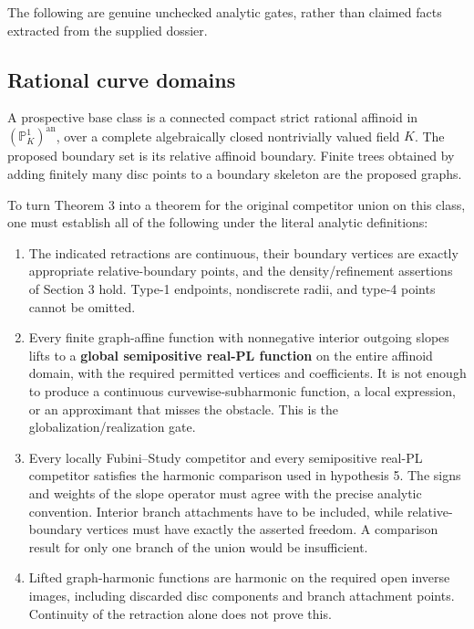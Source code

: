 \documentclass[
  11pt,
]{article}
\begin{document}
The following are genuine unchecked analytic gates, rather than claimed
facts extracted from the supplied dossier.

\subsection{Rational curve domains}\label{rational-curve-domains}

A prospective base class is a connected compact strict rational affinoid
in \((\mathbb P^1_K)^{\mathrm{an}}\), over a complete algebraically
closed nontrivially valued field \(K\). The proposed boundary set is its
relative affinoid boundary. Finite trees obtained by adding finitely
many disc points to a boundary skeleton are the proposed graphs.

To turn Theorem 3 into a theorem for the original competitor union on
this class, one must establish all of the following under the literal
analytic definitions:

\begin{enumerate}
\def\labelenumi{\arabic{enumi}.}
\item
  The indicated retractions are continuous, their boundary vertices are
  exactly appropriate relative-boundary points, and the
  density/refinement assertions of Section 3 hold. Type-1 endpoints,
  nondiscrete radii, and type-4 points cannot be omitted.
\item
  Every finite graph-affine function with nonnegative interior outgoing
  slopes lifts to a \textbf{global semipositive real-PL function} on the
  entire affinoid domain, with the required permitted vertices and
  coefficients. It is not enough to produce a continuous
  curvewise-subharmonic function, a local expression, or an approximant
  that misses the obstacle. This is the globalization/realization gate.
\item
  Every locally Fubini--Study competitor and every semipositive real-PL
  competitor satisfies the harmonic comparison used in hypothesis 5. The
  signs and weights of the slope operator must agree with the precise
  analytic convention. Interior branch attachments have to be included,
  while relative-boundary vertices must have exactly the asserted
  freedom. A comparison result for only one branch of the union would be
  insufficient.
\item
  Lifted graph-harmonic functions are harmonic on the required open
  inverse images, including discarded disc components and branch
  attachment points. Continuity of the retraction alone does not prove
  this.
\end{enumerate}
\end{document}
